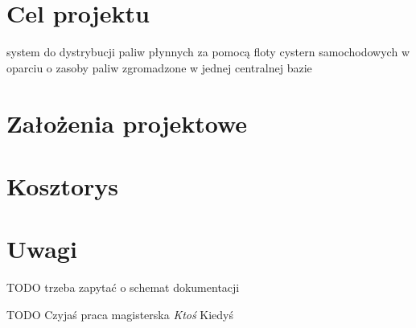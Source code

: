 \documentclass[11pt,a4paper,oneside]{mwart}
\begin{document}


\newpage
\thispagestyle{empty}
\newpage

\setcounter{tocdepth}{3}
\tableofcontents
\newpage


\section{Cel projektu}
system do dystrybucji paliw płynnych za pomocą floty cystern samochodowych w oparciu o zasoby paliw zgromadzone w jednej centralnej bazie
\section{Założenia projektowe}

\section{Kosztorys}
\section{Uwagi}
TODO trzeba zapytać o schemat dokumentacji



 
 \newpage
 \listoftables
 \listofwykress
 \listofschems

 \begin{thebibliography}{12}
    TODO Czyjaś praca magisterska \emph{Ktoś} Kiedyś
 \end{thebibliography}
\end{document}
